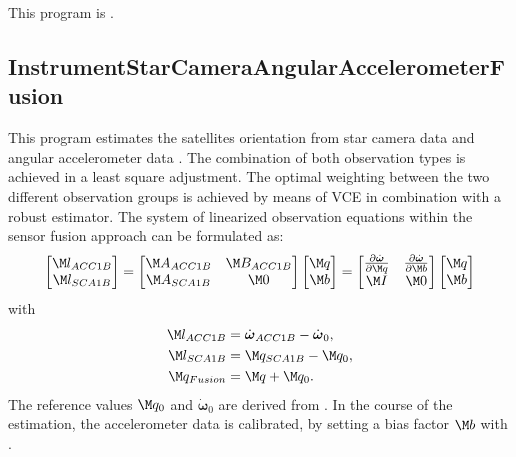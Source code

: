 This program is .
\clearpage
\subsection{InstrumentStarCameraAngularAccelerometerFusion}\label{InstrumentStarCameraAngularAccelerometerFusion}
This program estimates the satellites orientation from star camera data
 and angular accelerometer data
. The combination of both observation types
is achieved in a least square adjustment. The optimal weighting between the two different
observation groups is achieved by means of VCE in combination with a robust estimator.
The system of linearized observation equations within the sensor fusion approach can be formulated as:
\begin{equation}
  \begin{bmatrix}
  \M l_{ACC1B}\\
  \M l_{SCA1B}
  \end{bmatrix}
  =
  \begin{bmatrix}
  \M A_{ACC1B} & \M B_{ACC1B}\\
  \M A_{SCA1B} & \M 0
  \end{bmatrix}
  \begin{bmatrix}
  \M q\\
  \M b
  \end{bmatrix}
  =
  \begin{bmatrix}
  \frac{\partial \dot{\boldsymbol{\omega}}}{\partial \M q} & \frac{\partial \dot{\boldsymbol{\omega}}}{\partial \M b}\\
  \M I & \M 0
  \end{bmatrix}
  \begin{bmatrix}
  \M q\\
  \M b
  \end{bmatrix}
\end{equation}
with
\begin{equation}\begin{split}
  \M l_{ACC1B}  &= \dot{\boldsymbol{\omega}}_{ACC1B} - \dot{\boldsymbol{\omega}}_{0}, \\
  \M l_{SCA1B}  &= \M q_{SCA1B} - \M q_{0}, \\
  \M q_{Fusion} &= \M q + \M q_{0}.
\end{split}\end{equation}
The reference values $\M q_{0}$ and $\dot{\boldsymbol{\omega}}_{0}$ are derived
from . In the course of the estimation,
the accelerometer data is calibrated, by setting a bias factor $\M b$ with .


